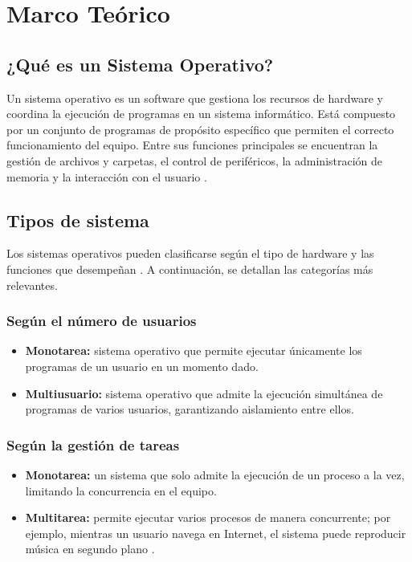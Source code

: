 \chapter{Marco Teórico}

\section{¿Qué es un Sistema Operativo?}

Un sistema operativo es un software que gestiona los recursos de hardware y coordina la ejecución de programas en un sistema informático. Está compuesto por un conjunto de programas de propósito específico que permiten el correcto funcionamiento del equipo. Entre sus funciones principales se encuentran la gestión de archivos y carpetas, el control de periféricos, la administración de memoria y la interacción con el usuario \parencite{ibm_que_es_so}.

\section{Tipos de sistema}

Los sistemas operativos pueden clasificarse según el tipo de hardware y las funciones que desempeñan \parencite{iglesiasconceptos}. A continuación, se detallan las categorías más relevantes.

\subsection{Según el número de usuarios}
\begin{itemize}
    \item \textbf{Monotarea:} sistema operativo que permite ejecutar únicamente los programas de un usuario en un momento dado.
    \item \textbf{Multiusuario:} sistema operativo que admite la ejecución simultánea de programas de varios usuarios, garantizando aislamiento entre ellos.
\end{itemize}

\subsection{Según la gestión de tareas}
\begin{itemize}
    \item \textbf{Monotarea:} un sistema que solo admite la ejecución de un proceso a la vez, limitando la concurrencia en el equipo.
    \item \textbf{Multitarea:} permite ejecutar varios procesos de manera concurrente; por ejemplo, mientras un usuario navega en Internet, el sistema puede reproducir música en segundo plano \textcite{ibm_que_es_so}.
\end{itemize}

